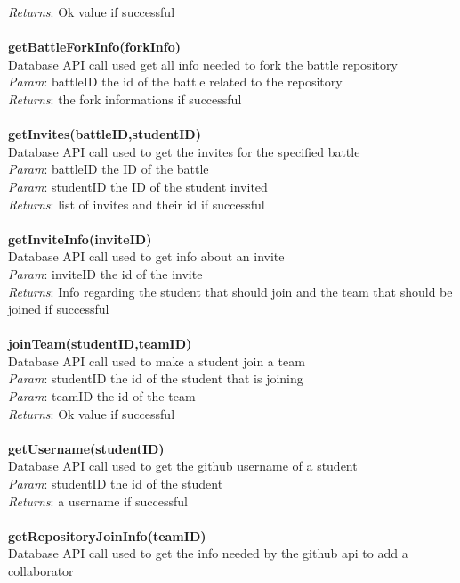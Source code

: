 \documentclass{article}
\begin{document}
\textit{Returns}: Ok value if successful\\
\\
\textbf{getBattleForkInfo(forkInfo)}\\
Database API call used get all info needed to fork the battle repository\\
\textit{Param}: battleID the id of the battle related to the repository\\
\textit{Returns}: the fork informations if successful\\
\\
\textbf{getInvites(battleID,studentID)}\\
Database API call used to get the invites for the specified battle\\
\textit{Param}: battleID the ID of the battle\\
\textit{Param}: studentID the ID of the student invited\\
\textit{Returns}: list of invites and their id if successful\\
\\
\textbf{getInviteInfo(inviteID)}\\
Database API call used to get info about an invite\\
\textit{Param}: inviteID the id of the invite\\
\textit{Returns}: Info regarding the student that should join and the team that should be joined if successful\\
\\
\textbf{joinTeam(studentID,teamID)}\\
Database API call used to make a student join a team\\
\textit{Param}: studentID the id of the student that is joining\\
\textit{Param}: teamID the id of the team\\
\textit{Returns}: Ok value if successful\\
\\
\textbf{getUsername(studentID)}\\
Database API call used to get the github username of a student\\
\textit{Param}: studentID the id of the student\\
\textit{Returns}: a username if successful\\
\\
\textbf{getRepositoryJoinInfo(teamID)}\\
Database API call used to get the info needed by the github api to add a collaborator\\
\end{document}

